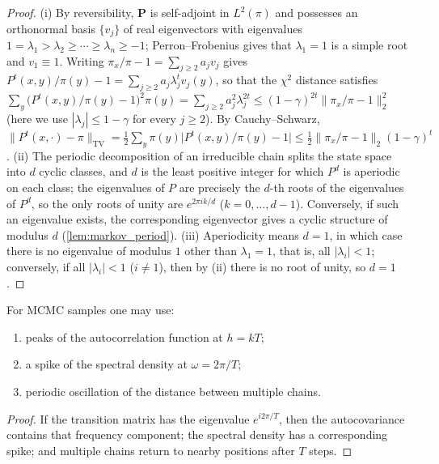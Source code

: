 \begin{proof}
(i) By reversibility, $\mathbf P$ is self-adjoint in $L^2(\pi)$ and possesses an orthonormal basis $\{v_j\}$ of real eigenvectors with eigenvalues $1=\lambda_1>\lambda_2\ge\cdots\ge\lambda_n\ge-1$; Perron--Frobenius gives that $\lambda_1=1$ is a simple root and $v_1\equiv1$. Writing $\pi_x/\pi-1=\sum_{j\ge2}a_jv_j$ gives $P^t(x,y)/\pi(y)-1=\sum_{j\ge2}a_j\lambda_j^tv_j(y)$, so that the $\chi^2$ distance satisfies $\sum_y\bigl(P^t(x,y)/\pi(y)-1\bigr)^2\pi(y)=\sum_{j\ge2}a_j^2\lambda_j^{2t}\le(1-\gamma)^{2t}\|\pi_x/\pi-1\|_2^2$ (here we use $|\lambda_j|\le1-\gamma$ for every $j\ge2$). By Cauchy--Schwarz, $\|P^t(x,\cdot)-\pi\|_{\mathrm{TV}}=\frac12\sum_y\pi(y)\bigl|P^t(x,y)/\pi(y)-1\bigr|\le\frac12\|\pi_x/\pi-1\|_2(1-\gamma)^t$.
(ii) The periodic decomposition of an irreducible chain splits the state space into $d$ cyclic classes, and $d$ is the least positive integer for which $P^d$ is aperiodic on each class; the eigenvalues of $P$ are precisely the $d$-th roots of the eigenvalues of $P^d$, so the only roots of unity are $e^{2\pi ik/d}$ ($k=0,\dots,d-1$). Conversely, if such an eigenvalue exists, the corresponding eigenvector gives a cyclic structure of modulus $d$ (\cref{lem:markov_period}).
(iii) Aperiodicity means $d=1$, in which case there is no eigenvalue of modulus $1$ other than $\lambda_1=1$, that is, all $|\lambda_i|<1$; conversely, if all $|\lambda_i|<1$ ($i\ne1$), then by (ii) there is no root of unity, so $d=1$.
\end{proof}

\begin{proposition}\label{prop:mcmc_periodicity}
For MCMC samples one may use:
\begin{enumerate}[label=(\roman*)]
    \item peaks of the autocorrelation function at $h=kT$;
    \item a spike of the spectral density at $\omega=2\pi/T$;
    \item periodic oscillation of the distance between multiple chains.
\end{enumerate}
\end{proposition}

\begin{proof}
If the transition matrix has the eigenvalue $e^{i2\pi/T}$, then the autocovariance contains that frequency component; the spectral density has a corresponding spike; and multiple chains return to nearby positions after $T$ steps.
\end{proof}

